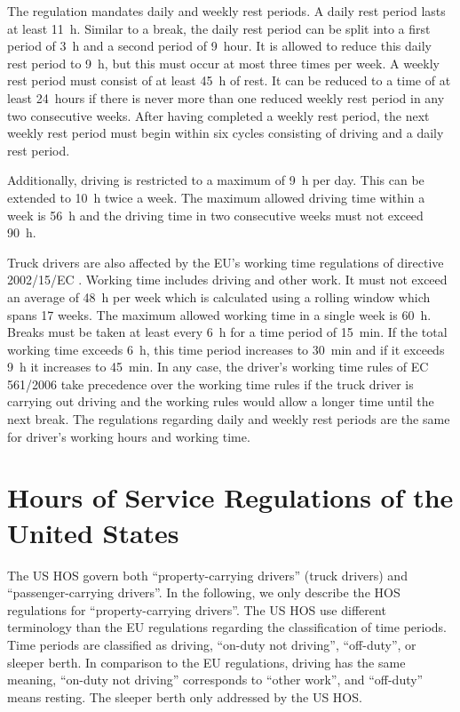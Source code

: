 The regulation mandates daily and weekly rest periods. A daily rest period lasts at least \SI{11}{\hour}. Similar to a break, the daily rest period can be split into a first period of \SI{3}{\hour} and a second period of \SI{9}{hour}. It is allowed to reduce this daily rest period to \SI{9}{\hour}, but this must occur at most three times per week. A weekly rest period must consist of at least \SI{45}{\hour} of rest. It can be reduced to a time of at least \SI{24}{hours} if there is never more than one reduced weekly rest period in any two consecutive weeks. After having completed a weekly rest period, the next weekly rest period must begin within six cycles consisting of driving and a daily rest period.

Additionally, driving is restricted to a maximum of \SI{9}{\hour} per day. This can be extended to \SI{10}{\hour} twice a week. The maximum allowed driving time within a week is \SI{56}{\hour} and the driving time in two consecutive weeks must not exceed \SI{90}{\hour}.

Truck drivers are also affected by the EU's working time regulations of directive 2002/15/EC \cite{europeanparliament:2002}. Working time includes driving and other work. It must not exceed an average of \SI{48}{\hour} per week which is calculated using a rolling window which spans 17 weeks. The maximum allowed working time in a single week is \SI{60}{\hour}. Breaks must be taken at least every \SI{6}{\hour} for a time period of \SI{15}{\minute}. If the total working time exceeds \SI{6}{\hour}, this time period increases to \SI{30}{\minute} and if it exceeds \SI{9}{\hour} it increases to \SI{45}{\minute}. In any case, the driver's working time rules of EC 561/2006 take precedence over the working time rules if the truck driver is carrying out driving and the working rules would allow a longer time until the next break. The regulations regarding daily and weekly rest periods are the same for driver's working hours and working time.

\section{Hours of Service Regulations of the United States\label{sec:hos_us}}
The US HOS \cite{federalmotorcarriersafetyadministrationfmcsa:2011} govern both ``property-carrying drivers'' (truck drivers) and ``passenger-carrying drivers''. In the following, we only describe the HOS regulations for ``property-carrying drivers''. The US HOS use different terminology than the EU regulations regarding the classification of time periods. Time periods are classified as driving, ``on-duty not driving'', ``off-duty'', or sleeper berth. In comparison to the EU regulations, driving has the same meaning, ``on-duty not driving'' corresponds to ``other work'', and ``off-duty'' means resting. The sleeper berth only addressed by the US HOS.


